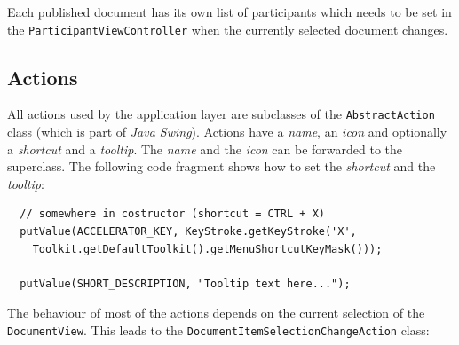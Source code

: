 Each published document has its own list of participants which needs to be set in the \texttt{Participant\-View\-Controller} when the currently selected document changes.


%

\subsection{Actions}
All actions used by the application layer are subclasses of the \texttt{Abstract\-Action} class (which is part of \emph{Java Swing}). Actions have a \emph{name}, an \emph{icon} and optionally a \emph{shortcut} and a \emph{tooltip}. The \emph{name} and the \emph{icon} can be forwarded to the superclass. The following code fragment shows how to set the \emph{shortcut} and the \emph{tooltip}:

\begin{verbatim}
  // somewhere in costructor (shortcut = CTRL + X)
  putValue(ACCELERATOR_KEY, KeyStroke.getKeyStroke('X',
    Toolkit.getDefaultToolkit().getMenuShortcutKeyMask()));

  putValue(SHORT_DESCRIPTION, "Tooltip text here...");
\end{verbatim}

The behaviour of most of the actions depends on the current selection of the \texttt{Document\-View}. This leads to the \texttt{Document\-Item\-Selection\-Change\-Action} class:

